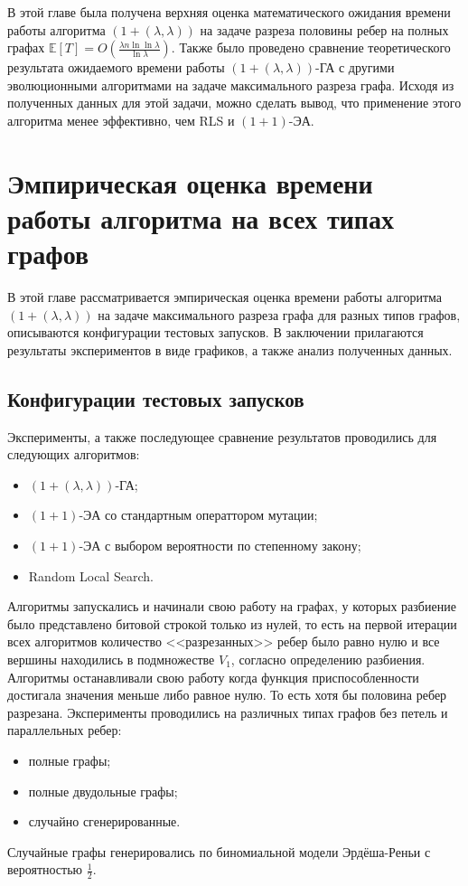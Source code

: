 \documentclass[times]{itmo-student-thesis}
\newcommand{\alglambda}{${(1 + (\lambda , \lambda))}$\xspace}
\newcommand{\alglambdaf}{${(1 + (\lambda , \lambda))}$-ГА\xspace}
\newcommand{\oea}{\mbox{$(1 + 1)$-ЭА}\xspace}
\begin{document}
\chapterconclusion

В этой главе была получена верхняя оценка математического ожидания времени работы алгоритма \alglambda на задаче разреза половины ребер на полных графах $\mathbb{E}[T]=O\left(\frac{\lambda n\ln \ln \lambda}{\ln \lambda}\right)$. Также было проведено сравнение теоретического результата ожидаемого времени работы \alglambdaf с другими эволюционными алгоритмами на задаче максимального разреза графа. Исходя из полученных данных для этой задачи, можно сделать вывод, что применение этого алгоритма менее эффективно, чем RLS и \oea.


\chapter{Эмпирическая оценка времени работы алгоритма на всех типах графов}
В этой главе рассматривается эмпирическая оценка времени работы алгоритма \alglambda на задаче максимального разреза графа для разных типов графов, описываются конфигурации тестовых запусков. В заключении прилагаются результаты экспериментов в виде графиков, а также анализ полученных данных.

\section{Конфигурации тестовых запусков}
Эксперименты, а также последующее сравнение результатов проводились для следующих алгоритмов:
\begin{itemize}
 \item \alglambdaf;
 \item \oea со стандартным операттором мутации;
 \item \oea с выбором вероятности по степенному закону;
 \item Random Local Search.
\end{itemize}
Алгоритмы запускались и начинали свою работу на графах, у которых разбиение было представлено битовой строкой только из нулей, то есть на первой итерации всех алгоритмов количество <<разрезанных>> ребер было равно нулю и все вершины находились в подмножестве $V_1$, согласно определению разбиения. Алгоритмы останавливали свою работу когда функция приспособленности достигала значения меньше либо равное нулю. То есть хотя бы половина ребер разрезана.
Эксперименты проводились на различных типах графов без петель и параллельных ребер:
\begin{itemize}
 \item полные графы;
 \item полные двудольные графы;
 \item случайно сгенерированные.
\end{itemize}
Случайные графы генерировались по биномиальной модели Эрдёша-Реньи с вероятностью $\frac{1}{2}$.
\end{document}
